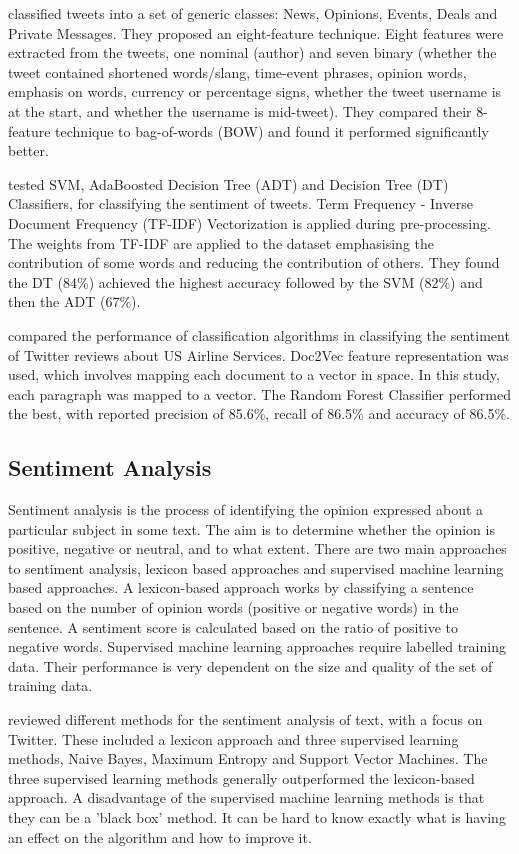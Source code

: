\cite{sriram2010} classified tweets into a set of generic classes: News, Opinions, Events, Deals and Private Messages. They proposed an eight-feature technique. Eight features were extracted from the tweets, one nominal (author) and seven binary (whether the tweet contained shortened words/slang, time-event phrases, opinion words, emphasis on words, currency or percentage signs, whether the tweet username is at the start, and whether the username is mid-tweet). They compared their 8-feature technique to bag-of-words (BOW) and found it performed significantly better.

\cite{Raithi2018} tested SVM, AdaBoosted Decision Tree (ADT) and Decision Tree (DT) Classifiers, for classifying the sentiment of tweets. Term Frequency - Inverse Document Frequency (TF-IDF) Vectorization is applied during pre-processing. The weights from TF-IDF are applied to the dataset emphasising the contribution of some words and reducing the contribution of others. They found the DT (84\%) achieved the highest accuracy followed by the SVM (82\%) and then the ADT (67\%).

\cite{Rane2018} compared the performance of classification algorithms in classifying the sentiment of Twitter reviews about US Airline Services. Doc2Vec feature representation was used, which involves mapping each document to a vector in space. In this study, each paragraph was mapped to a vector. The Random Forest Classifier performed the best, with reported precision of 85.6\%, recall of 86.5\% and accuracy of 86.5\%. 

\subsection{Sentiment Analysis}

Sentiment analysis is the process of identifying the opinion expressed about a particular subject in some text. The aim is to determine whether the opinion is positive, negative or neutral, and to what extent. There are two main approaches to sentiment analysis, lexicon based approaches and supervised machine learning based approaches. A lexicon-based approach works by classifying a sentence based on the number of opinion words (positive or negative words) in the sentence. A sentiment score is calculated based on the ratio of positive to negative words. Supervised machine learning approaches require labelled training data. Their performance is very dependent on the size and quality of the set of training data. 

\cite{Bhuta2014} reviewed different methods for the sentiment analysis of text, with a focus on Twitter. These included a lexicon approach and three supervised learning methods, Naive Bayes, Maximum Entropy and Support Vector Machines. The three supervised learning methods generally outperformed the lexicon-based approach. A disadvantage of the supervised machine learning methods is that they can be a 'black box' method. It can be hard to know exactly what is having an effect on the algorithm and how to improve it.

